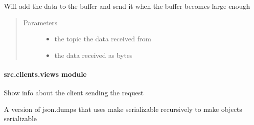 \documentclass[letterpaper,10pt,english]{sphinxmanual}
\begin{document}
\begin{fulllineitems}
\begin{fulllineitems}
Will add the data to the buffer and send it when the buffer becomes large enough
\begin{quote}\begin{description}
\item[{Parameters}] \leavevmode\begin{itemize}
\item {} 
 \textendash{} the topic the data received from

\item {} 
 \textendash{} the data received as bytes

\end{itemize}

\end{description}\end{quote}

\end{fulllineitems}


\end{fulllineitems}



\paragraph{src.clients.views module}
\label{\detokenize{src.clients:module-src.clients.views}}\label{\detokenize{src.clients:src-clients-views-module}}

\begin{fulllineitems}
\label{\detokenize{src.clients:src.clients.views.client}}
Show info about the client sending the request

\end{fulllineitems}


\begin{fulllineitems}
\label{\detokenize{src.clients:src.clients.views.dumps}}
A version of json.dumps that uses make serializable recursively to make objects serializable

\end{fulllineitems}
\end{document}
